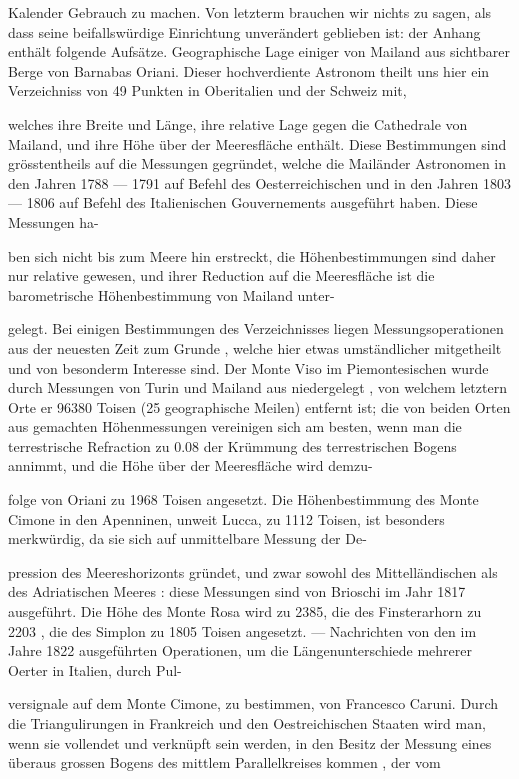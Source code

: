 \documentclass[10pt,a4paper]{article}
\begin{document}
Kalender Gebrauch zu machen. Von letzterm brauchen wir nichts zu sagen, als dass seine beifallswürdige Einrichtung unverändert geblieben ist: der Anhang enthält folgende Aufsätze. Geographische Lage einiger von Mailand aus sichtbarer Berge von Barnabas Oriani. Dieser hochverdiente Astronom theilt uns hier ein Verzeichniss von 49 Punkten in Oberitalien und der Schweiz mit,

welches ihre Breite und Länge, ihre relative Lage gegen die Cathedrale von Mailand, und ihre Höhe über der Meeresfläche enthält. Diese Bestimmungen sind grösstentheils auf die Messungen gegründet, welche die Mailänder Astronomen in den Jahren 1788 — 1791 auf Befehl des Oesterreichischen und in den Jahren 1803 — 1806 auf Befehl des Italienischen Gouvernements ausgeführt haben. Diese Messungen ha-

ben sich nicht bis zum Meere hin erstreckt, die Höhenbestimmungen sind daher nur relative gewesen, und ihrer Reduction auf die Meeresfläche ist die barometrische Höhenbestimmung von Mailand unter-

gelegt. Bei einigen Bestimmungen des Verzeichnisses liegen Messungsoperationen aus der neuesten Zeit zum Grunde , welche hier etwas umständlicher mitgetheilt und von besonderm Interesse sind. Der Monte Viso im Piemontesischen wurde durch Messungen von Turin und Mailand aus niedergelegt , von welchem letztern Orte er 96380 Toisen (25 geographische Meilen) entfernt ist; die von beiden Orten aus gemachten Höhenmessungen vereinigen sich am besten, wenn man die terrestrische Refraction zu 0.08 der Krümmung des terrestrischen Bogens annimmt, und die Höhe über der Meeresfläche wird demzu-

folge von Oriani zu 1968 Toisen angesetzt. Die Höhenbestimmung des Monte Cimone in den Apenninen, unweit Lucca, zu 1112 Toisen, ist besonders merkwürdig, da sie sich auf unmittelbare Messung der De-

pression des Meereshorizonts gründet, und zwar sowohl des Mittelländischen als des Adriatischen Meeres : diese Messungen sind von Brioschi im Jahr 1817 ausgeführt. Die Höhe des Monte Rosa wird zu 2385, die des Finsterarhorn zu 2203 , die des Simplon zu 1805 Toisen angesetzt. — Nachrichten von den im Jahre 1822 ausgeführten Operationen, um die Längenunterschiede mehrerer Oerter in Italien, durch Pul-

versignale auf dem Monte Cimone, zu bestimmen, von Francesco Caruni. Durch die Triangulirungen in Frankreich und den Oestreichischen Staaten wird man, wenn sie vollendet und verknüpft sein werden, in den Besitz der Messung eines überaus grossen Bogens des mittlem Parallelkreises kommen , der vom
\end{document}
